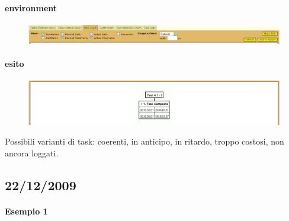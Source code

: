 \paragraph{environment}
\begin{figure}
\centering
\includegraphics[width=\textwidth]{tests/TEST_WBS/4.1/4.1_3/Esempio_2/environment.png}
\end{figure}
\paragraph{esito}
\begin{figure}
\centering
\includegraphics[width=\textwidth]{tests/TEST_WBS/4.1/4.1_3/Esempio_2/output.png}
\end{figure}

Possibili varianti di task: coerenti, in anticipo, in ritardo, troppo costosi, non ancora loggati.

\subsection{22/12/2009}
\paragraph{Esempio 1}
